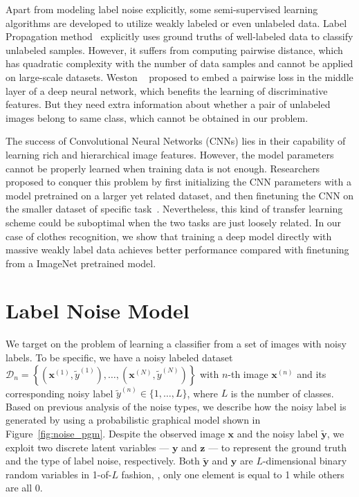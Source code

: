 \documentclass[10pt,twocolumn,letterpaper]{article}
\def\vec{\mathbf}
\begin{document}
Apart from modeling label noise explicitly, some semi-supervised learning algorithms are developed to utilize weakly labeled or even unlabeled data. Label Propagation method~\cite{zhu2002learning} explicitly uses ground truths of well-labeled data to classify unlabeled samples. However, it suffers from computing pairwise distance, which has quadratic complexity with the number of data samples and cannot be applied on large-scale datasets. Weston \etal~\cite{weston2012deep} proposed to embed a pairwise loss in the middle layer of a deep neural network, which benefits the learning of discriminative features. But they need extra information about whether a pair of unlabeled images belong to same class, which cannot be obtained in our problem.

The success of Convolutional Neural Networks (CNNs) lies in their capability of learning rich and hierarchical image features. However, the model parameters cannot be properly learned when training data is not enough. Researchers proposed to conquer this problem by first initializing the CNN parameters with a model pretrained on a larger yet related dataset, and then finetuning the CNN on the smaller dataset of specific task~\cite{krizhevsky2012imagenet,oquab2013learning,azizpour2014generic}. Nevertheless, this kind of transfer learning scheme could be suboptimal when the two tasks are just loosely related. In our case of clothes recognition, we show that training a deep model directly with massive weakly label data achieves better performance compared with finetuning from a ImageNet pretrained model.


\section{Label Noise Model} %
\label{sec:label_noise_model}
We target on the problem of learning a classifier from a set of images with noisy labels. To be specific, we have a noisy labeled dataset $\mathcal{D}_n=\left\{\left(\vec{x}^{(1)}, \tilde{y}^{(1)}\right), \dots, \left(\vec{x}^{(N)}, \tilde{y}^{(N)}\right)\right\}$ with $n$-th image $\vec{x}^{(n)}$ and its corresponding noisy label $\tilde{y}^{(n)} \in \{1,\dots,L\}$, where $L$ is the number of classes. Based on previous analysis of the noise types, we describe how the noisy label is generated by using a probabilistic graphical model shown in Figure~\ref{fig:noise_pgm}. Despite the observed image $\vec{x}$ and the noisy label $\tilde{\vec{y}}$, we exploit two discrete latent variables --- $\vec{y}$ and $\vec{z}$ --- to represent the ground truth and the type of label noise, respectively. Both $\tilde{\vec{y}}$ and $\vec{y}$ are $L$-dimensional binary random variables in 1-of-$L$ fashion, \ie, only one element is equal to 1 while others are all 0.
\end{document}
